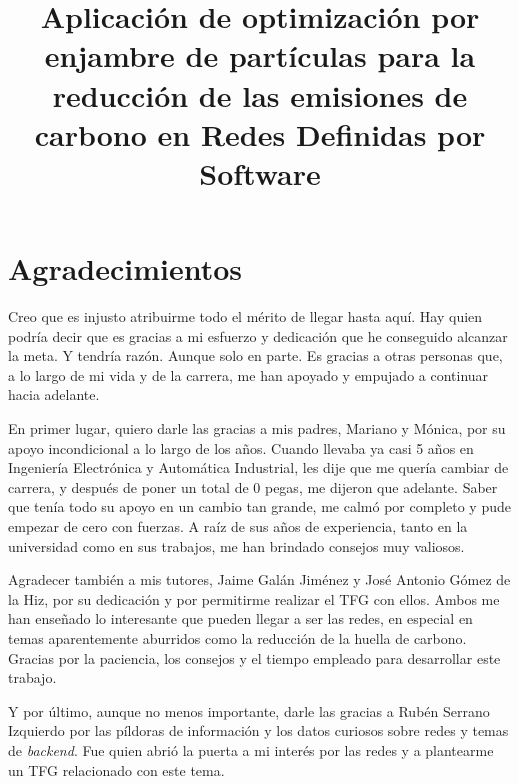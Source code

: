 \documentclass[minitoc, hidelinks, headlogo, framedcover]{tfeEPCC}
\title{Aplicación de optimización por enjambre de partículas para la reducción de las emisiones de carbono en Redes Definidas por Software}
\begin{document}
\sloppy 
\pagebreak 


\pagestyle{empty}



\chapter*{Agradecimientos}

Creo que es injusto atribuirme todo el mérito de llegar hasta aquí. Hay quien podría decir que es gracias a mi esfuerzo y dedicación que he conseguido alcanzar la meta. Y tendría razón. Aunque solo en parte. Es gracias a otras personas que, a lo largo de mi vida y de la carrera, me han apoyado y empujado a continuar hacia adelante.

En primer lugar, quiero darle las gracias a mis padres, Mariano y Mónica, por su apoyo incondicional a lo largo de los años. Cuando llevaba ya casi 5 años en Ingeniería Electrónica y Automática Industrial, les dije que me quería cambiar de carrera, y después de poner un total de 0 pegas, me dijeron que adelante. Saber que tenía todo su apoyo en un cambio tan grande, me calmó por completo y pude empezar de cero con fuerzas. A raíz de sus años de experiencia, tanto en la universidad como en sus trabajos, me han brindado consejos muy valiosos.

Agradecer también a mis tutores, Jaime Galán Jiménez y José Antonio Gómez de la Hiz, por su dedicación y por permitirme realizar el TFG con ellos. Ambos me han enseñado lo interesante que pueden llegar a ser las redes, en especial en temas aparentemente aburridos como la reducción de la huella de carbono. Gracias por la paciencia, los consejos y el tiempo empleado para desarrollar este trabajo.

Y por último, aunque no menos importante, darle las gracias a Rubén Serrano Izquierdo por las píldoras de información y los datos curiosos sobre redes y temas de \textit{backend}. Fue quien abrió la puerta a mi interés por las redes y a plantearme un TFG relacionado con este tema.
\end{document}
